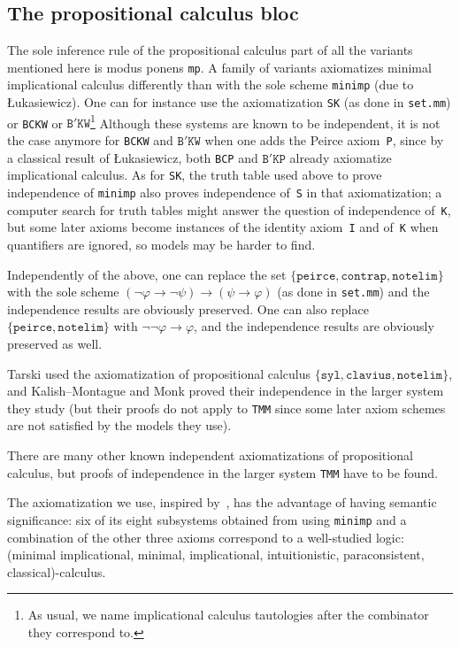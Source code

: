 \documentclass[11pt]{article}
\renewcommand*{\phi}{\varphi}
\theoremstyle{plain}
\theoremstyle{definition}
\theoremstyle{remark}
\begin{document}
\subsection{The propositional calculus bloc}

The sole inference rule of the propositional calculus part of all the variants mentioned here
is modus ponens \texttt{mp}.
A family of variants axiomatizes minimal implicational calculus differently than with the sole
scheme \texttt{minimp} (due to {\L}ukasiewicz).
One can for instance use the axiomatization \texttt{SK} (as done in \texttt{set.mm})
or \texttt{BCKW} or $\texttt{B}'\texttt{KW}$\footnote{
As usual, we name implicational calculus tautologies after the combinator they correspond to.}
Although these systems are known to be independent, it is not the case anymore for \texttt{BCKW}
and $\texttt{B}'\texttt{KW}$ when one adds the Peirce axiom~\texttt{P}, since by a classical
result of {\L}ukasiewicz, both \texttt{BCP} and $\texttt{B}'\texttt{KP}$ already axiomatize
implicational calculus.
As for \texttt{SK}, the truth table used above to prove independence of \texttt{minimp} also
proves independence of~\texttt{S} in that axiomatization; a computer search for truth tables
might answer the question of independence of~\texttt{K}, but some later axioms become instances
of the identity axiom~\texttt{I} and of~\texttt{K} when quantifiers are ignored, so models may be
harder to find.

Independently of the above, one can replace the set
$\{\texttt{peirce}, \texttt{contrap}, \texttt{notelim}\}$ with the sole scheme
$(\neg \phi \to \neg \psi) \to (\psi \to \phi)$ (as done in \texttt{set.mm}) and the independence
results are obviously preserved.
One can also replace $\{\texttt{peirce}, \texttt{notelim}\}$ with $\neg \neg \phi \to \phi$,
and the independence results are obviously preserved as well.

Tarski used the axiomatization of propositional calculus
$\{\texttt{syl}, \texttt{clavius}, \texttt{notelim}\}$, and Kalish--Montague and Monk proved their
independence in the larger system they study (but their proofs do not apply to \texttt{TMM} since
some later axiom schemes are not satisfied by the models they use).

There are many other known independent axiomatizations of propositional calculus, but proofs of
independence in the larger system \texttt{TMM} have to be found.

The axiomatization we use, inspired by~\cite{robinson}, has the advantage of having semantic
significance: six of its eight subsystems obtained from using \texttt{minimp} and a combination of
the other three axioms correspond to a well-studied logic: (minimal implicational, minimal,
implicational, intuitionistic, paraconsistent, classical)-calculus.
\end{document}

